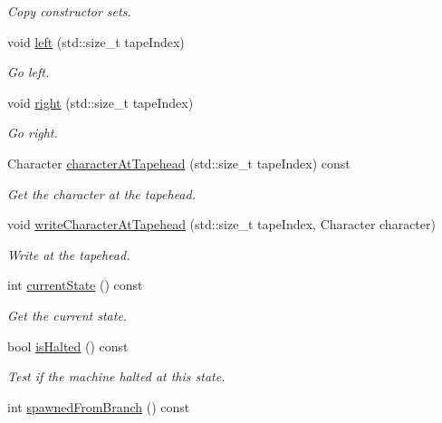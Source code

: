 \begin{DoxyCompactItemize}
\begin{DoxyCompactList}\small\item\em \-Copy constructor sets. \end{DoxyCompactList}\item 
void \hyperlink{classtum_1_1_simulated_state_a596575962ca8a88684abefdd45a1609e}{left} (std\-::size\-\_\-t tape\-Index)
\begin{DoxyCompactList}\small\item\em \-Go left. \end{DoxyCompactList}\item 
void \hyperlink{classtum_1_1_simulated_state_a0402b35b293421111ac8e097699f40ad}{right} (std\-::size\-\_\-t tape\-Index)
\begin{DoxyCompactList}\small\item\em \-Go right. \end{DoxyCompactList}\item 
\-Character \hyperlink{classtum_1_1_simulated_state_a1bf8c6d070c22e4dffa654b7f08f7493}{character\-At\-Tapehead} (std\-::size\-\_\-t tape\-Index) const 
\begin{DoxyCompactList}\small\item\em \-Get the character at the tapehead. \end{DoxyCompactList}\item 
void \hyperlink{classtum_1_1_simulated_state_aafc304c78ecbfb8454f91177e0ed42b8}{write\-Character\-At\-Tapehead} (std\-::size\-\_\-t tape\-Index, \-Character character)
\begin{DoxyCompactList}\small\item\em \-Write  at the tapehead. \end{DoxyCompactList}\item 
int \hyperlink{classtum_1_1_simulated_state_abb03b31a7beee78dcbcc42aa901e956b}{current\-State} () const 
\begin{DoxyCompactList}\small\item\em \-Get the current state. \end{DoxyCompactList}\item 
bool \hyperlink{classtum_1_1_simulated_state_ab5f3df720113c89f5e84f56c289e9aa2}{is\-Halted} () const 
\begin{DoxyCompactList}\small\item\em \-Test if the machine halted at this state. \end{DoxyCompactList}\item 
int \hyperlink{classtum_1_1_simulated_state_a6c1dc2d948e9f2eae5f01853ec10047a}{spawned\-From\-Branch} () const 

\end{DoxyCompactItemize}
